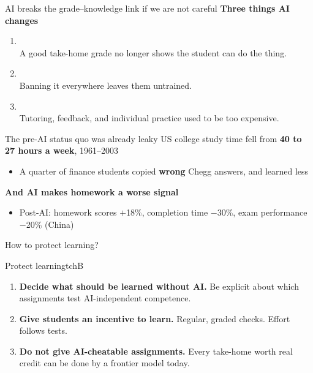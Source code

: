 \documentclass[aspectratio=169, 10pt]{beamer}
\begin{document}
\begin{frame}{AI breaks the grade--knowledge link if we are not careful}
\vskip0.1cm
\textbf{Three things AI changes}
\begin{enumerate}\small\setlength{\itemsep}{2pt}
  \item {} \\ A good take-home grade no longer shows the student can do the thing.
  \medskip
  \item {} \\
  Banning it everywhere leaves them untrained.
     \medskip
  \item {} \\ 
  Tutoring, feedback, and individual practice used to be too expensive.
\end{enumerate}
\end{frame}


\begin{frame}{The pre-AI status quo was already leaky }
  US college study time fell from \textbf{40 to 27 hours a week}, 1961--2003
\begin{itemize}\setlength{\itemsep}{1pt}
  \item A quarter of finance students copied \textbf{wrong} Chegg answers, and learned less
\end{itemize}
\bigskip 
\textbf{And AI makes homework a worse signal}
\begin{itemize}\setlength{\itemsep}{1pt}
  \item Post-AI: homework scores $+$18\%, completion time $-$30\%, exam performance $-$20\% (China)
\end{itemize}

\end{frame}

\begin{frame}{How to protect learning? }
\begin{mckcardg}[mckteal]{Protect learning}{tchB}
\begin{enumerate}\setlength{\itemsep}{2pt}
  \item \textbf{Decide what should be learned without AI.} Be explicit about which assignments test AI-independent competence.
  \item \textbf{Give students an incentive to learn.} Regular, graded checks. Effort follows tests.
  \item \textbf{Do not give AI-cheatable assignments.} Every take-home worth real credit can be done by a frontier model today.
\end{enumerate}
\end{mckcardg}

\end{frame}
\end{document}
